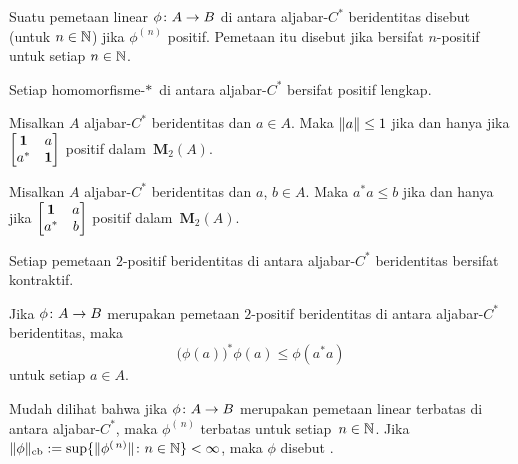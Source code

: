 \begin{defn} Suatu pemetaan linear $\phi\colon A \rightarrow B$ di antara aljabar-$C^*$ beridentitas disebut
 (untuk $n \in \mathbb{N}$) jika $\phi^{(\,n)}$ positif. Pemetaan itu disebut
 jika bersifat $n$-positif untuk setiap $n \in \mathbb{N}$.
\end{defn}

\begin{exam} Setiap homomorfisme-$*\,$ di antara aljabar-$C^*$ bersifat positif lengkap.
\end{exam}

\begin{prop}\label{00582811} Misalkan $A$ aljabar-$C^*$ beridentitas dan $a \in A$. Maka $\lVert a\rVert \le 1$ jika dan hanya jika
$\begin{bmatrix} \mathbf{1} & a \\ a^* & \mathbf{1} \end{bmatrix}$ positif dalam~$\mathbf M_2(A)$.
\end{prop}

\begin{prop} Misalkan $A$ aljabar-$C^*$ beridentitas dan $a$, $b \in A$. Maka $a^*a \le b$ jika
dan hanya jika $\begin{bmatrix} \mathbf{1} & a \\ a^* & b \end{bmatrix}$ positif dalam~$\mathbf
M_2(A)$.
\end{prop}

\begin{prop} Setiap pemetaan $2$-positif beridentitas di antara aljabar-$C^*$ beridentitas bersifat kontraktif.
\end{prop}

\begin{prop}\label{0058283} Jika $\phi\colon A \rightarrow B$ merupakan pemetaan
$2$-positif beridentitas
di antara aljabar-$C^*$ beridentitas, maka
   \[ \bigl(\phi(a)\bigr)^*\phi(a) \le \phi(a^*a) \]
untuk setiap $a \in A$.
\end{prop}

\begin{defn} Mudah dilihat bahwa jika $\phi\colon A \rightarrow B$ merupakan pemetaan linear terbatas
di antara aljabar-$C^*$, maka $\phi^{(\,n)}$ terbatas untuk setiap~$n \in \mathbb{N}$. Jika
$\lVert\phi\rVert_{\mathrm{cb}} := \sup\{\lVert\phi^{(\,n)}\rVert \colon n \in \mathbb{N}\} < \infty$, maka
$\phi$ disebut
.
\end{defn}

